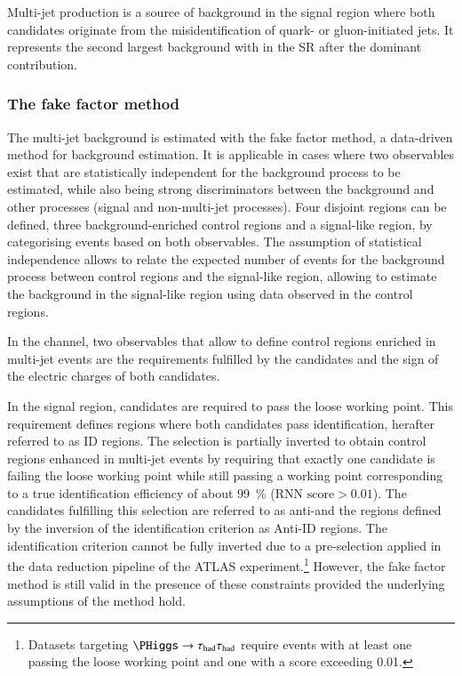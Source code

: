 \label{sec:hadhad_multijet}


Multi-jet production is a source of background in the \hadhad signal
region where both \tauhadvis candidates originate from the
misidentification of quark- or gluon-initiated jets. It represents the
second largest background with \faketauhadvis in the \hadhad SR after
the dominant \ttbarFakes contribution.

\subsubsection{The fake factor method}

The multi-jet background is estimated with the fake factor method, a
data-driven method for background estimation. It is applicable in
cases where two observables exist that are statistically independent
for the background process to be estimated, while also being strong
discriminators between the background and other processes (signal and
non-multi-jet processes). Four disjoint regions can be defined, three
background-enriched control regions and a signal-like region, by
categorising events based on both observables. The assumption of
statistical independence allows to relate the expected number of
events for the background process between control regions and the
signal-like region, allowing to estimate the background in the
signal-like region using data observed in the control regions.

In the \hadhad channel, two observables that allow to define control
regions enriched in multi-jet events are the \tauid requirements
fulfilled by the \tauhadvis candidates and the sign of the electric
charges of both candidates.

In the signal region, \tauhadvis candidates are required to pass the
loose \tauid working point. This requirement defines regions where
both \tauhadvis candidates pass identification, herafter referred to
as ID regions. The selection is partially inverted to obtain control
regions enhanced in multi-jet events by requiring that exactly one
\tauhadvis candidate is failing the loose \tauid working point while
still passing a working point corresponding to a true \tauhadvis
identification efficiency of about \SI{99}{\percent}
($\text{RNN score} > 0.01$). The \tauhadvis candidates fulfilling this
selection are referred to as anti-\tauhadvis and the regions defined
by the inversion of the identification criterion as Anti-ID
regions. The identification criterion cannot be fully inverted due to
a pre-selection applied in the data reduction pipeline of the ATLAS
experiment.\footnote{Datasets targeting $\PHiggs \to \hadhad$ require
  events with at least one \tauhadvis passing the loose \tauid working
  point and one \tauhadvis with a \tauid score exceeding 0.01.}
However, the fake factor method is still valid in the presence of
these constraints provided the underlying assumptions of the method
hold.

